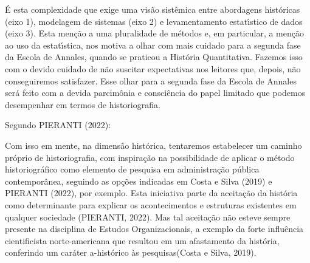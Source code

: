 \documentclass[
12pt,		%
openright,	%
twoside,  %
a4paper,			%
chapter=TITLE,		%
english,			%
french,				%
spanish,			%
brazil				%
]{USPSC-classe/USPSC}
\begin{document}
\'E esta complexidade que exige uma vis\~ao sist\^emica entre abordagens hist\'oricas (eixo 1), modelagem de sistemas (eixo 2) e levamentamento estat\'{\i}stico de dados (eixo 3). Esta men\c{c}\~ao a uma pluralidade de m\'etodos e, em particular, a men\c{c}\~ao ao uso da estat\'{\i}stica, nos motiva a olhar com mais cuidado para a segunda fase da Escola de Annales, quando se praticou a \textquotedbl Hist\'oria Quantitativa\textquotedbl . Fazemos isso com o devido cuidado de n\~ao suscitar expectativas nos leitores que, depois, n\~ao conseguiremos satisfazer. Esse olhar para a segunda fase da Escola de Annales ser\'a feito com a devida parcim\^onia e consci\^encia do papel limitado que podemos desempenhar em termos de historiografia.




Segundo PIERANTI (2022):





\noindent\begin{center}\mbox{\centering{}}\end{center}


Com isso em mente, na dimens\~ao hist\'orica, tentaremos estabelecer um caminho pr\'oprio de historiografia, com inspira\c{c}\~ao na possibilidade de aplicar o m\'etodo historiogr\'afico como elemento de pesquisa em administra\c{c}\~ao p\'ublica contempor\^anea, seguindo as op\c{c}\~oes indicadas em   Costa e Silva (2019) e PIERANTI (2022), por exemplo. Esta iniciativa parte da aceita\c{c}\~ao da hist\'oria como determinante para explicar os acontecimentos e estruturas existentes em qualquer sociedade (PIERANTI, 2022). Mas tal aceita\c{c}\~ao n\~ao esteve sempre presente na disciplina de Estudos Organizacionais, a exemplo da \textquotedbl forte influ\^encia cientificista norte-americana que resultou em um afastamento da hist\'oria, conferindo um car\'ater a-hist\'orico \`as pesquisas\textquotedbl   (Costa e Silva, 2019).
\end{document}
